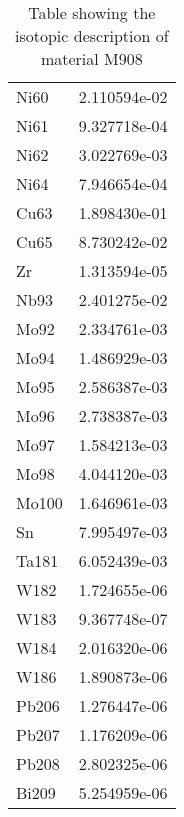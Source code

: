 \begin{centering}
\begin{table}[ht!]
\begin{tabular}{l | c}
Ni60 & 2.110594e-02\\
Ni61 & 9.327718e-04\\
Ni62 & 3.022769e-03\\
Ni64 & 7.946654e-04\\
Cu63 & 1.898430e-01\\
Cu65 & 8.730242e-02\\
Zr & 1.313594e-05\\
Nb93 & 2.401275e-02\\
Mo92 & 2.334761e-03\\
Mo94 & 1.486929e-03\\
Mo95 & 2.586387e-03\\
Mo96 & 2.738387e-03\\
Mo97 & 1.584213e-03\\
Mo98 & 4.044120e-03\\
Mo100 & 1.646961e-03\\
Sn & 7.995497e-03\\
Ta181 & 6.052439e-03\\
W182 & 1.724655e-06\\
W183 & 9.367748e-07\\
W184 & 2.016320e-06\\
W186 & 1.890873e-06\\
Pb206 & 1.276447e-06\\
Pb207 & 1.176209e-06\\
Pb208 & 2.802325e-06\\
Bi209 & 5.254959e-06
\end{tabular}
\caption{Table showing the isotopic description of material M908}
\label{table:material_M908}
\end{table}\clearpage


\end{centering}
